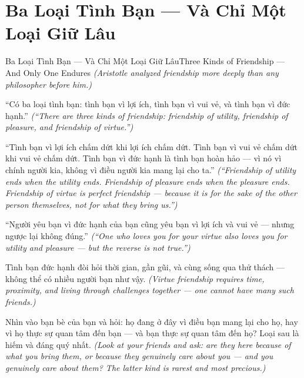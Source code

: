 \section{Ba Loại Tình Bạn — Và Chỉ Một Loại Giữ Lâu}
\begin{truyen}{Ba Loại Tình Bạn — Và Chỉ Một Loại Giữ Lâu}{Three Kinds of Friendship — And Only One Endures}
\textit{(Aristotle analyzed friendship more deeply than any philosopher before him.)}

``Có ba loại tình bạn: tình bạn vì lợi ích, tình bạn vì vui vẻ, và tình bạn vì đức hạnh.''
\textit{(``There are three kinds of friendship: friendship of utility, friendship of pleasure, and friendship of virtue.'')}

``Tình bạn vì lợi ích chấm dứt khi lợi ích chấm dứt. Tình bạn vì vui vẻ chấm dứt khi vui vẻ chấm dứt. Tình bạn vì đức hạnh là tình bạn hoàn hảo — vì nó vì chính người kia, không vì điều người kia mang lại cho ta.''
\textit{(``Friendship of utility ends when the utility ends. Friendship of pleasure ends when the pleasure ends. Friendship of virtue is perfect friendship — because it is for the sake of the other person themselves, not for what they bring us.'')}

``Người yêu bạn vì đức hạnh của bạn cũng yêu bạn vì lợi ích và vui vẻ — nhưng ngược lại không đúng.''
\textit{(``One who loves you for your virtue also loves you for utility and pleasure — but the reverse is not true.'')}

Tình bạn đức hạnh đòi hỏi thời gian, gần gũi, và cùng sống qua thử thách — không thể có nhiều người bạn như vậy.
\textit{(Virtue friendship requires time, proximity, and living through challenges together — one cannot have many such friends.)}

\end{truyen}

\begin{baihoc}
Nhìn vào bạn bè của bạn và hỏi: họ đang ở đây vì điều bạn mang lại cho họ, hay vì họ thực sự quan tâm đến bạn — và bạn thực sự quan tâm đến họ? Loại sau là hiếm và đáng quý nhất.
\textit{(Look at your friends and ask: are they here because of what you bring them, or because they genuinely care about you — and you genuinely care about them? The latter kind is rarest and most precious.)}
\end{baihoc}
\ngancach


